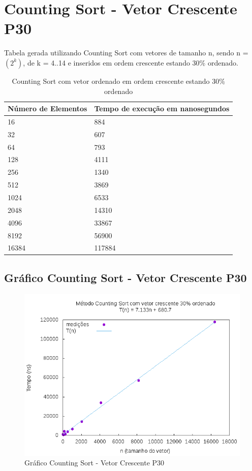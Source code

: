 \documentclass[12pt,a4paper,twoside]{report}
\begin{document}
\section{Counting Sort - Vetor Crescente P30}
Tabela gerada utilizando Counting Sort com vetores de tamanho n, sendo n = $(2^k)$, de k = 4..14 e inseridos em ordem crescente estando 30\% ordenado.
\begin{table}[H]
\centering
\caption{Counting Sort com vetor ordenado em ordem crescente estando 30\% ordenado}
\label{my-label}
\begin{tabular}{|l|l|}
\hline
\multicolumn{1}{|c|}{\textbf{Número de Elementos}} & \multicolumn{1}{c|}{\textbf{Tempo de execução em nanosegundos}} \\ \hline
16 & 884 \\ \hline
32 & 607 \\ \hline
64 & 793 \\ \hline
128 & 4111 \\ \hline
256 & 1340 \\ \hline
512 & 3869 \\ \hline
1024 & 6533 \\ \hline
2048 & 14310 \\ \hline
4096 & 33867 \\ \hline
8192 & 56900 \\ \hline
16384 & 117884 \\ \hline
\end{tabular}
\end{table}

\subsection{Gráfico Counting Sort - Vetor Crescente P30}
\begin{figure}[H]
    \centering
    \includegraphics[width=0.7\linewidth]{graficos/CountingSort/vIntCrescenteP30/vIntCrescenteP30.png}
  \caption{Gráfico Counting Sort - Vetor Crescente P30}
\end{figure}
\end{document}
